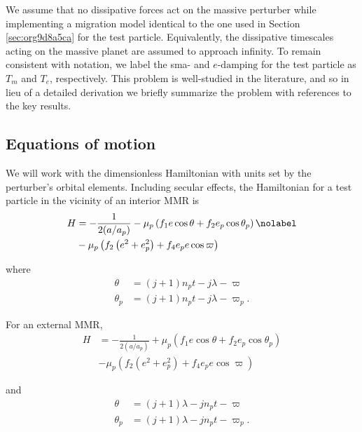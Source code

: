 \documentclass[usenatbib,twocolumn]{mnras}
\begin{document}
We assume that no dissipative forces act on the massive perturber
while implementing a migration model identical to the one used in
Section \ref{sec:org9d8a5ca} for the test particle.
Equivalently, the dissipative timescales acting on the massive planet
are assumed to approach infinity.  To remain consistent with notation,
we label the sma- and \(e\text{-damping}\) for the test particle as
\(T_{m}\) and \(T_{e}\), respectively. This problem is well-studied in the
literature, and so in lieu of a detailed derivation we briefly
summarize the problem with references to the key results.

\subsection{Equations of motion}
\label{sec:orgb79b5ce}
We will work with the dimensionless Hamiltonian with units set by the
perturber's orbital elements.  Including secular effects, the
Hamiltonian for a test particle in the vicinity of an interior MMR is
\citep[c.f.][]{xu_migration_2018,goldreich_overstable_2014,wisdom_canonical_1986,deck_migration_2015,henrard86_reduc_trans_apocen_librat}
\begin{align}
  \label{eq:tpint}
  H
  &= - \frac{1}{2(a/a_p)} - \mu_p\left(f_1
    e\cos\theta +f_2 e_p\cos\theta_p\right) \nolabel\\
  &- \mu_p \left(f_2\left(e^2 + e_p^2\right)
    + f_4e_p e\cos\varpi\right)
\end{align}

\noindent
where
\begin{align}
  \theta &= (j+1)n_p t - j\lambda - \varpi \\
  \theta_p &= (j+1)n_p t - j\lambda - \varpi_p.
\end{align}

\noindent
For an external MMR, 
\begin{align*}
  \label{eq:tpext}
  H
  &= - \frac{1}{2(a/a_p)} + \mu_p\left(f_1
    e\cos\theta +f_2
    e_p\cos\theta_p\right) \\
  &- \mu_p \left(f_2\left(e^2
      + e_p^2\right) + f_4e_p
    e\cos\varpi\right)
\end{align*}

\noindent
and
\begin{align}
  \theta &= (j+1)\lambda - jn_pt - \varpi \\
  \theta_p &= (j+1)\lambda - jn_pt - \varpi_p.
\end{align}
\end{document}
